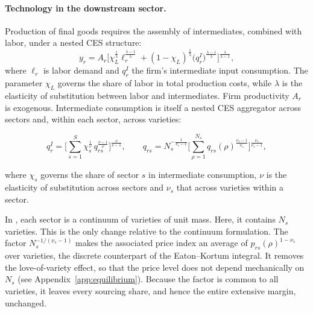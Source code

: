 \paragraph{Technology in the downstream sector.} Production of final goods requires the assembly of intermediates, combined with labor, under a nested CES structure:
\begin{equation}
y_{r}=A_{r}\Big[\chi_{L}^{\frac{1}{\lambda}}\ell_{r}^{\frac{\lambda-1}{\lambda}}
+(1-\chi_{L})^{\frac{1}{\lambda}}\big(q^{I}_{r}\big)^{\frac{\lambda-1}{\lambda}}\Big]^{\frac{\lambda}{\lambda-1}},
\end{equation}
where $\ell_{r}$ is labor demand and $q^{I}_{r}$ the firm's intermediate input consumption. The parameter $\chi_{L}$ governs the share of labor in total production costs, while $\lambda$ is the elasticity of substitution between labor and intermediates. Firm productivity $A_{r}$ is exogenous. Intermediate consumption is itself a nested CES aggregator across sectors and, within each sector, across varieties:

\begin{equation}
q^I_r = \Big[\sum_{s=1}^S \chi_s^{\frac{1}{\nu}}\, q_{rs}^{\frac{\nu-1}{\nu}}\Big]^{\frac{\nu}{\nu-1}},
\qquad
q_{rs} = N_s^{-\frac{1}{\nu_s-1}}
\Big[\sum_{\rho=1}^{N_s} q_{rs}(\rho)^{\frac{\nu_s-1}{\nu_s}}\Big]^{\frac{\nu_s}{\nu_s-1}},
\label{eq:app-ces}
\end{equation}

where $\chi_{s}$ governs the share of sector $s$ in intermediate consumption, $\nu$ is the elasticity of substitution across sectors and $\nu_{s}$ that across varieties within a sector.

In \cite{EatonKortum2002}, each sector is a continuum of varieties of unit mass. Here, it contains $N_{s}$ varieties. This is the only change relative to the continuum formulation. The factor $N_{s}^{-1/(\nu_{s}-1)}$ makes the associated price index an average of $p_{rs}(\rho)^{1-\nu_{s}}$ over varieties, the discrete counterpart of the Eaton--Kortum integral. It removes the love-of-variety effect, so that the price level does not depend mechanically on $N_{s}$ (see Appendix~\ref{app:equilibrium}). Because the factor is common to all varieties, it leaves every sourcing share, and hence the entire extensive margin, unchanged.

